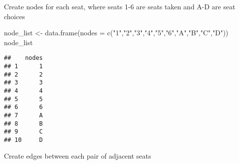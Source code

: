 \documentclass[
]{article}
\newenvironment{Shaded}{\begin{snugshade}}{\end{snugshade}}
\newcommand{\AttributeTok}[1]{\textcolor[rgb]{0.77,0.63,0.00}{#1}}
\newcommand{\FunctionTok}[1]{\textcolor[rgb]{0.00,0.00,0.00}{#1}}
\newcommand{\NormalTok}[1]{#1}
\newcommand{\OtherTok}[1]{\textcolor[rgb]{0.56,0.35,0.01}{#1}}
\newcommand{\StringTok}[1]{\textcolor[rgb]{0.31,0.60,0.02}{#1}}
\begin{document}
Create nodes for each seat, where seats 1-6 are seats taken and A-D are
seat choices

\begin{Shaded}
\begin{Highlighting}[]
\NormalTok{node\_list }\OtherTok{\textless{}{-}} \FunctionTok{data.frame}\NormalTok{(}\AttributeTok{nodes =} \FunctionTok{c}\NormalTok{(}\StringTok{"1"}\NormalTok{,}\StringTok{"2"}\NormalTok{,}\StringTok{"3"}\NormalTok{,}\StringTok{"4"}\NormalTok{,}\StringTok{"5"}\NormalTok{,}\StringTok{"6"}\NormalTok{,}\StringTok{"A"}\NormalTok{,}\StringTok{"B"}\NormalTok{,}\StringTok{"C"}\NormalTok{,}\StringTok{"D"}\NormalTok{))}
\NormalTok{node\_list}
\end{Highlighting}
\end{Shaded}

\begin{verbatim}
##    nodes
## 1      1
## 2      2
## 3      3
## 4      4
## 5      5
## 6      6
## 7      A
## 8      B
## 9      C
## 10     D
\end{verbatim}

Create edges between each pair of adjacent seats
\end{document}
